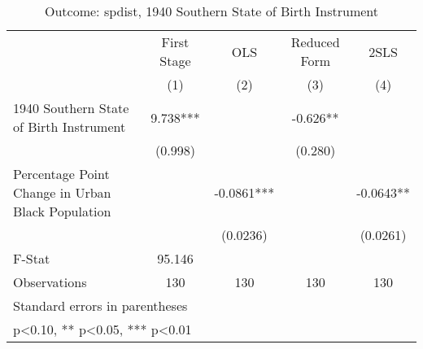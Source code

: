\begin{table}[htbp]\centering
\def\sym#1{\ifmmode^{#1}\else\(^{#1}\)\fi}
\caption{Outcome: spdist, 1940 Southern State of Birth Instrument}
\begin{tabular}{l*{4}{c}}
\toprule
                    & First Stage   &         OLS   &Reduced Form   &        2SLS   \\
                    &\multicolumn{1}{c}{(1)}   &\multicolumn{1}{c}{(2)}   &\multicolumn{1}{c}{(3)}   &\multicolumn{1}{c}{(4)}   \\
\midrule
1940 Southern State of Birth Instrument&       9.738***&               &      -0.626** &               \\
                    &     (0.998)   &               &     (0.280)   &               \\
\addlinespace
Percentage Point Change in Urban Black Population&               &     -0.0861***&               &     -0.0643** \\
                    &               &    (0.0236)   &               &    (0.0261)   \\
\midrule
F-Stat              &      95.146   &               &               &               \\
Observations        &         130   &         130   &         130   &         130   \\
\bottomrule
\multicolumn{5}{l}{\footnotesize Standard errors in parentheses}\\
\multicolumn{5}{l}{\footnotesize * p<0.10, ** p<0.05, *** p<0.01}\\
\end{tabular}
\end{table}

